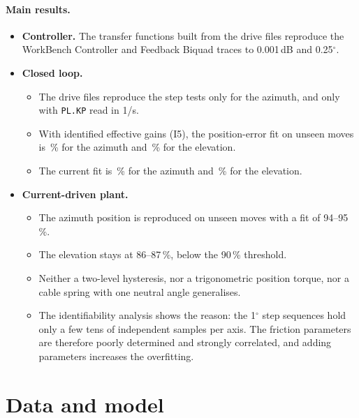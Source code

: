 \documentclass[10pt,a4paper]{article}
\numberwithin{equation}{section}
\begin{document}
\paragraph{Main results.}
\begin{itemize}
\item \textbf{Controller.} The transfer functions built from the drive files reproduce the WorkBench Controller and Feedback Biquad traces to 0.001\,dB and 0.25$^\circ$.
\item \textbf{Closed loop.}
  \begin{itemize}
  \item The drive files reproduce the step tests only for the azimuth, and only with \texttt{PL.KP} read in 1/s.
  \item With identified effective gains (I5), the position-error fit on unseen moves is \IfiveAzErr\,\% for the azimuth and \IfiveElErr\,\% for the elevation.
  \item The current fit is \IfiveAzCur\,\% for the azimuth and \IfiveElCur\,\% for the elevation.
  \end{itemize}
\item \textbf{Current-driven plant.}
  \begin{itemize}
  \item The azimuth position is reproduced on unseen moves with a fit of 94--95\,\%.
  \item The elevation stays at 86--87\,\%, below the 90\,\% threshold.
  \item Neither a two-level hysteresis, nor a trigonometric position torque, nor a cable spring with one neutral angle generalises.
  \item The identifiability analysis shows the reason: the 1$^\circ$ step sequences hold only a few tens of independent samples per axis. The friction parameters are therefore poorly determined and strongly correlated, and adding parameters increases the overfitting.
  \end{itemize}
\end{itemize}

\tableofcontents

\section{Data and model}\label{sec:data}
\end{document}
